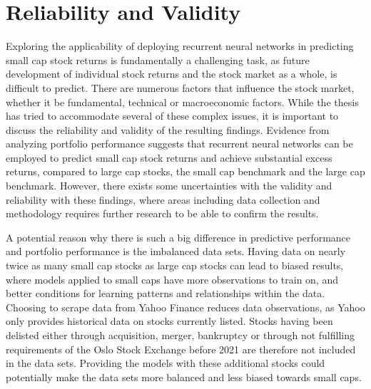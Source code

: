 \section{Reliability and Validity}
Exploring the applicability of deploying recurrent neural networks in predicting small cap stock returns is fundamentally a challenging task, as future development of individual stock returns and the stock market as a whole, is difficult to predict. There are numerous factors that influence the stock market, whether it be fundamental, technical or macroeconomic factors. While the thesis has tried to accommodate several of these complex issues, it is important to discuss the reliability and validity of the resulting findings. Evidence from analyzing portfolio performance suggests that recurrent neural networks can be employed to predict small cap stock returns and achieve substantial excess returns, compared to large cap stocks, the small cap benchmark and the large cap benchmark. However, there exists some uncertainties with the validity and reliability with these findings, where areas including data collection and methodology requires further research to be able to confirm the results. 

\indent\newline
A potential reason why there is such a big difference in predictive performance and portfolio performance is the imbalanced data sets. Having data on nearly twice as many small cap stocks as large cap stocks can lead to biased results, where models applied to small caps have more observations to train on, and better conditions for learning patterns and relationships within the data. Choosing to scrape data from Yahoo Finance reduces data observations, as Yahoo only provides historical data on stocks currently listed. Stocks having been delisted either through acquisition, merger, bankruptcy or through not fulfilling requirements of the Oslo Stock Exchange before 2021 are therefore not included in the data sets. Providing the models with these additional stocks could potentially make the data sets more balanced and less biased towards small caps.     


